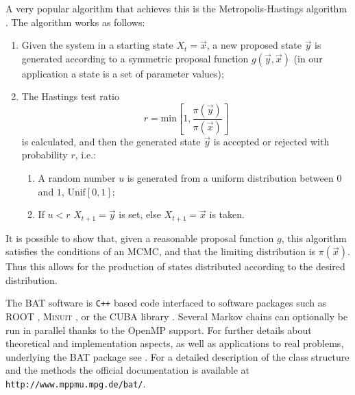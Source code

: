 A very popular algorithm that achieves this is the Metropolis-Hastings algorithm \cite{Metropolis,Hastings}. The algorithm works as follows:
\begin{enumerate}
	\item Given the system in a starting state $X_t=\vec{x}$, a new proposed state $\vec{y}$ is generated according to a symmetric proposal function $g(\vec{y},\vec{x})$ (in our application a state is a set of parameter values);
	\item The Hastings test ratio
		\[r=\text{min}\left[1,\frac{\pi(\vec{y})}{\pi(\vec{x})}\right]\]
		is calculated, and then the generated state $\vec{y}$ is accepted or rejected with probability $r$, i.e.:
		\begin{enumerate}
			\item A random number $u$ is generated from a uniform distribution between $0$ and $1$, $\text{Unif}[0,1]$;
			\item If $u<r$ $X_{t+1}=\vec{y}$ is set, else $X_{t+1}=\vec{x}$ is taken.
		\end{enumerate}
\end{enumerate}
It is possible to show that, given a reasonable proposal function $g$, this algorithm satisfies the conditions of an MCMC, and that the limiting distribution is $\pi(\vec{x})$. Thus this allows for the production of states distributed according to the desired distribution.

 The BAT software is \texttt{C++} based code interfaced to software packages such as ROOT \cite{ROOT}, \textsc{Minuit} \cite{MINUIT}, or the CUBA library \cite{CUBA}. Several Markov chains can optionally be run in parallel thanks to the OpenMP \cite{openmp} support. For further details about theoretical and implementation aspects, as well as applications to real problems, underlying the BAT package see \cite{BAT}. For a detailed description of the class structure and the methods the official documentation is available at \texttt{http://www.mppmu.mpg.de/bat/}.

